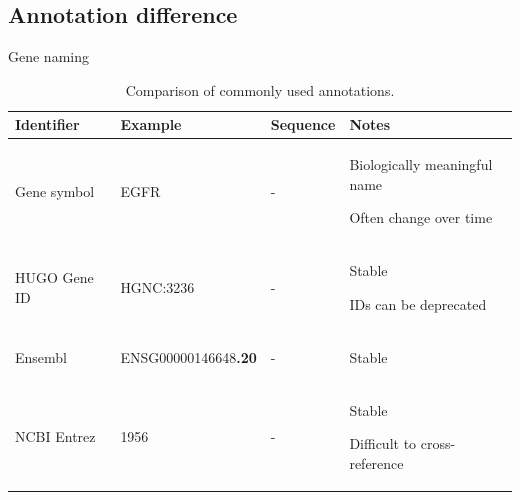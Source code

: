\subsection{Annotation difference}


Gene naming \cite{fujiyoshik_oginos:OpinionStandardizing2021, brufordea_tweedies:GuidelinesHuman2020} 

\begin{SingleSpace}
\begin{table}[tbp]
    \centering
    \caption{Comparison of commonly used annotations.}
    \label{tab:intro-anno}

    \footnotesize
    \begin{subtable}{1\linewidth}
        \centering
        \label{tab:intro-anno-gene}
        \begin{tabular}{lllp{15em}}
            \toprule
            Identifier      & Example   & Sequence  & Notes \\
            \midrule
            Gene symbol     & EGFR      & -         &
            \begin{tablist}
                \item Biologically meaningful name
                \item Often change over time
            \end{tablist}\\
            HUGO Gene ID    & HGNC:3236 & -         &
            \begin{tablist}
                \item Stable
                \item IDs can be deprecated
            \end{tablist}\\
            Ensembl         & ENSG00000146648\textbf{.20} & - &
            \begin{tablist}
                \item Stable
            \end{tablist} \\
            NCBI Entrez	    & 1956      & -         &
            \begin{tablist}
                \item Stable
                \item Difficult to cross-reference
            \end{tablist} \\
            \bottomrule
        \end{tabular}
    \end{subtable}


\end{table}
\end{SingleSpace}
